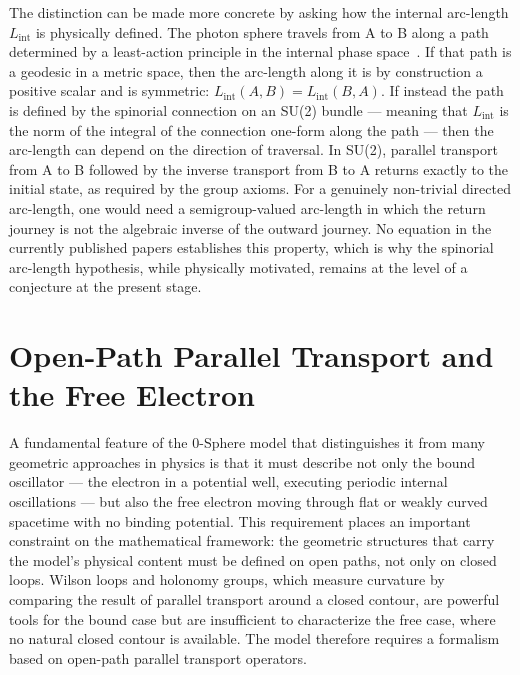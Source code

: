 \documentclass[%
 reprint,
 amsmath,amssymb,
 aps,
 prb,
]{revtex4-2}
\numberwithin{equation}{section}
\newcommand{\Lint}{L_{\text{int}}}
\begin{document}
The distinction can be made more concrete by asking how the internal arc-length $\Lint$ is physically defined. The photon sphere travels from A to B along a path determined by a least-action principle in the internal phase space~\cite{paper23,paper33}. If that path is a geodesic in a metric space, then the arc-length along it is by construction a positive scalar and is symmetric: $\Lint(A,B) = \Lint(B,A)$. If instead the path is defined by the spinorial connection on an SU(2) bundle --- meaning that $\Lint$ is the norm of the integral of the connection one-form along the path --- then the arc-length can depend on the direction of traversal. In SU(2), parallel transport from A to B followed by the inverse transport from B to A returns exactly to the initial state, as required by the group axioms. For a genuinely non-trivial directed arc-length, one would need a semigroup-valued arc-length in which the return journey is not the algebraic inverse of the outward journey. No equation in the currently published papers establishes this property, which is why the spinorial arc-length hypothesis, while physically motivated, remains at the level of a conjecture at the present stage.

\section{Open-Path Parallel Transport and the Free Electron}
\label{sec:openpath}

A fundamental feature of the 0-Sphere model that distinguishes it from many geometric approaches in physics is that it must describe not only the bound oscillator --- the electron in a potential well, executing periodic internal oscillations --- but also the free electron moving through flat or weakly curved spacetime with no binding potential. This requirement places an important constraint on the mathematical framework: the geometric structures that carry the model's physical content must be defined on open paths, not only on closed loops. Wilson loops and holonomy groups, which measure curvature by comparing the result of parallel transport around a closed contour, are powerful tools for the bound case but are insufficient to characterize the free case, where no natural closed contour is available. The model therefore requires a formalism based on open-path parallel transport operators.
\end{document}

